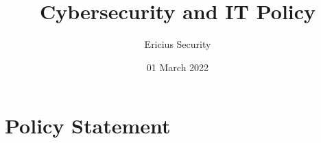 \documentclass[12pt, letterpaper, oneside, BCOR=5mm]{scrartcl}
\title{Cybersecurity and IT Policy}
\author{Ericius Security}
\date{01 March 2022}
\begin{document}
    \maketitle
    \section{Policy Statement}
    
\end{document}

